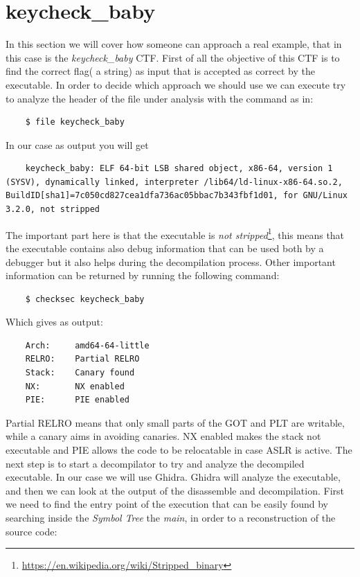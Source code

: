 \documentclass{article}
\begin{document}
\section{keycheck\_baby}
In this section we will cover how someone can approach a real example, that in this case is the \textit{keycheck\_baby} CTF.
First of all the objective of this CTF is to find the correct flag( a string) as input that is accepted as correct by the executable.
In order to decide which approach we should use we can execute try to analyze the header of the file under analysis with the command as in:
\begin{verbatim}
    $ file keycheck_baby
\end{verbatim}
In our case as output you will get
\begin{verbatim}
    keycheck_baby: ELF 64-bit LSB shared object, x86-64, version 1 (SYSV), dynamically linked, interpreter /lib64/ld-linux-x86-64.so.2, BuildID[sha1]=7c050cd827cea1dfa736ac05bbac7b343fbf1d01, for GNU/Linux 3.2.0, not stripped
\end{verbatim}
The important part here is that the executable is \textit{not stripped}\footnote{\url{https://en.wikipedia.org/wiki/Stripped_binary}}, this means that the executable contains also debug information that can be used both by a debugger but it also helps during the decompilation process.
Other important information can be returned by running the following command:
\begin{verbatim}
    $ checksec keycheck_baby
\end{verbatim}
Which gives as output:
\begin{verbatim}
    Arch:     amd64-64-little
    RELRO:    Partial RELRO
    Stack:    Canary found
    NX:       NX enabled
    PIE:      PIE enabled
\end{verbatim}
Partial RELRO means that only small parts of the GOT and PLT are writable, while a canary aims in avoiding canaries. NX enabled makes the stack not executable and PIE allows the code to be relocatable in case ASLR is active.
The next step is to start a decompilator to try and analyze the decompiled executable. In our case we will use Ghidra. Ghidra will analyze the executable, and then we can look at the output of the disassemble and decompilation.
First we need to find the entry point of the execution that can be easily found by searching inside the \textit{Symbol Tree} the \textit{main}, in order to a reconstruction of the source code:
\end{document}

